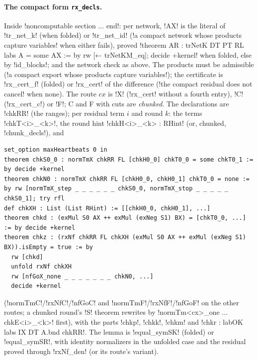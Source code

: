 {{{\paragraph{The compact form \texttt{rx\_decls}.} Inside \lexlean!noncomputable section ... end!:
per network, \lexlean!AX! is the literal of \lexpy!tr_net_k! (when folded) or \lexpy!tr_net_id!
(\lexcode!a compact network whose products capture variables! when either fails), proved
\lexlean!theorem AR : trNetK DT PT RL labs A = some AX := by rw [← trNetKM_eq]; decide +kernel!
when folded, else by \lexpy!id_blocks!; and the network check as above. The products must be
admissible (\lexcode!a compact export whose products capture variables!); the certificate is
\lexpy!rx_cert_f! (folded) or \lexpy!rx_cert! of the difference (\lexcode!the compact residual does not cancel!
when none). The route $cx$ is \lexlean!X! (\lexpy!rx_cert! without a fourth entry), \lexlean!C!
(\lexpy!rx_cert_c!) or \lexlean!F!; C and F with cuts are \emph{chunked}. The declarations are
\lexlean!chkRR! (the ranges); per residual term $i$ and round $k$: the terms \lexlean!chkT<i>_<k>!,
the round hint \lexlean!chkH<i>_<k> : RHint! (or, chunked, \lexpy!chunk_decls!), and
\begin{lstlisting}[style=lexlean]
set_option maxHeartbeats 0 in
theorem chkS0_0 : normTmX chkRR FL [chkH0_0] chkT0_0 = some chkT0_1 := by decide +kernel
theorem chkN0 : normTmX chkRR FL [chkH0_0, chkH0_1] chkT0_0 = none := by rw [normTmX_step _ _ _ _ _ _ chkS0_0, normTmX_stop _ _ _ _ _ chkS0_1]; try rfl
def chkXH : List (List RHint) := [[chkH0_0, chkH0_1], ...]
theorem chkd : (exMul S0 AX ++ exMul (exNeg S1) BX) = [chkT0_0, ...] := by decide +kernel
theorem chkz : (rxNf chkRR FL chkXH (exMul S0 AX ++ exMul (exNeg S1) BX)).isEmpty = true := by
  rw [chkd]
  unfold rxNf chkXH
  rw [nfGoX_none _ _ _ _ _ _ _ chkN0, ...]
  decide +kernel
\end{lstlisting}
(\lexlean!normTmC!/\lexlean!rxNfC!/\lexlean!nfGoC! and \lexlean!normTmF!/\lexlean!rxNfF!/\lexlean!nfGoF! on the
other routes; a chunked round's \lexlean!S! theorem rewrites by \lexlean!normTm<cx>_one ... chkE<i>_<k>!
first), with the parts \lexlean!chkp!, \lexlean!chkk!, \lexlean!chkm! and
\lexlean!chkr : labOK labs IX DT A.bnd chkRR!. The lemma is \lexlean!equal_symSK! (folded) or
\lexlean!equal_symSR!, with identity normalizers in the unfolded case and the residual proved
through \lexlean!rxNf_den! (or its route's variant).

}}}
